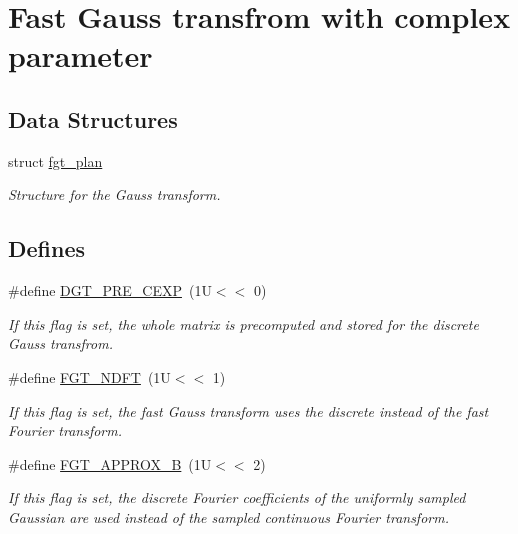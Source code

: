 \hypertarget{group__applications__fastgauss}{
\section{Fast Gauss transfrom with complex parameter}
\label{group__applications__fastgauss}
}
\subsection*{Data Structures}
\begin{CompactItemize}
\item 
struct \hyperlink{structfgt__plan}{fgt\_\-plan}
\begin{CompactList}\small\item\em Structure for the Gauss transform. \item\end{CompactList}\end{CompactItemize}
\subsection*{Defines}
\begin{CompactItemize}
\item 
\#define \hyperlink{group__applications__fastgauss_ga13}{DGT\_\-PRE\_\-CEXP}~(1U$<$$<$ 0)
\begin{CompactList}\small\item\em If this flag is set, the whole matrix is precomputed and stored for the discrete Gauss transfrom. \item\end{CompactList}\item 
\#define \hyperlink{group__applications__fastgauss_ga14}{FGT\_\-NDFT}~(1U$<$$<$ 1)
\begin{CompactList}\small\item\em If this flag is set, the fast Gauss transform uses the discrete instead of the fast Fourier transform. \item\end{CompactList}\item 
\#define \hyperlink{group__applications__fastgauss_ga15}{FGT\_\-APPROX\_\-B}~(1U$<$$<$ 2)
\begin{CompactList}\small\item\em If this flag is set, the discrete Fourier coefficients of the uniformly sampled Gaussian are used instead of the sampled continuous Fourier transform. \item\end{CompactList}\end{CompactItemize}
